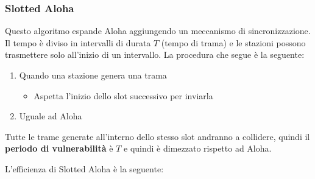 \documentclass[a4paper]{article}
\begin{document}
\subsubsection{Slotted Aloha}
Questo algoritmo espande Aloha aggiungendo un meccanismo di sincronizzazione. Il
tempo è diviso in intervalli di durata \( T \) (tempo di trama) e le stazioni
possono trasmettere solo all'inizio di un intervallo. La procedura che segue è la
seguente:
\begin{enumerate}
  \item Quando una stazione genera una trama
    \begin{itemize}
      \item Aspetta l'inizio dello slot successivo per inviarla
    \end{itemize}
  \item Uguale ad Aloha
\end{enumerate}

\vspace{1em}
\noindent
\label{04-12-D3}
Tutte le trame generate all'interno dello stesso slot andranno a collidere, quindi
il \textbf{periodo di vulnerabilità} è \( T \) e quindi è dimezzato rispetto ad Aloha.

\vspace{1em}
\noindent
L'efficienza di Slotted Aloha è la seguente:
\label{04-12-D4}
\end{document}
